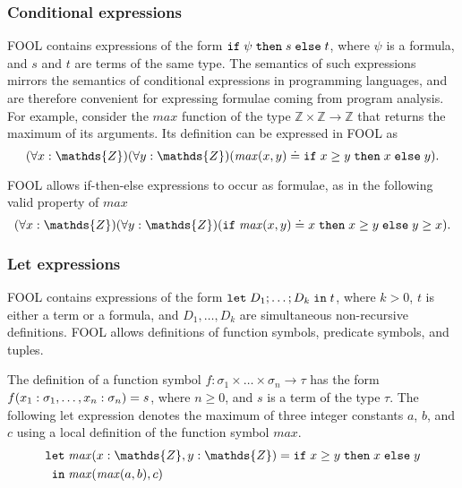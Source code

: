 \documentclass{easychair}
\begin{document}
\subsubsection*{Conditional expressions}
FOOL contains expressions of the form $\mathtt{if}\;{\psi}\;\allowbreak\mathtt{then}\;{s}\;\allowbreak\mathtt{else}\;{t}$, where $\psi$ is a
formula, and $s$ and $t$ are terms of the same type. 
The semantics of such expressions mirrors the semantics of conditional 
expressions in programming languages, and are therefore convenient for 
expressing formulae coming from program analysis. 
For example, consider the $\mathit{max}$ function of the type 
$\mathds{Z}\times\mathds{Z}\to\mathds{Z}$ that returns the maximum of its 
arguments. 
Its definition can be expressed in FOOL as
\begin{equation}\label{eq:ite-t-example}
(\forall x:\mathds{Z})(\forall y:\mathds{Z})
(\mathit{max}(x, y) \eql \ite{x \geq y}{x}{y}).
\end{equation}

FOOL allows if-then-else expressions to occur as formulae, as in the
following valid property of $\mathit{max}$
\begin{equation}\label{eq:ite-f-example}
(\forall x:\mathds{Z})(\forall y:\mathds{Z})
(\ite{\mathit{max}(x, y) \eql x}{x \geq y}{y \geq x}).
\end{equation}

\subsubsection*{Let expressions}
FOOL contains expressions of the form $\mathtt{let}\;{D_1;\ldots;D_k}\;\allowbreak\mathtt{in}\;{t}$, where
$k > 0$, $t$ is either a term or a formula, and $D_1,\ldots,D_k$ are
simultaneous non-recursive definitions. FOOL allows definitions of function
symbols, predicate symbols, and tuples.

The definition of a function symbol 
$f:\sigma_1\times\ldots\times\sigma_n\to\tau$ has the form 
${f(x_1:\sigma_1,\ldots,x_n:\sigma_n)}={s}$, where
$n \geq 0$, and $s$ is a term of the type $\tau$.
The following let expression denotes the maximum of three integer constants
$a$, $b$, and $c$ using a local definition of the function symbol
$\mathit{max}$.
\begin{equation}\label{eq:fool-let-impl}
\begin{aligned}
\mathtt{let}\;&\binding{\mathit{max}(x:\mathds{Z},y:\mathds{Z})}
                       {\ite{x \geq y}{x}{y}}\\
 \mathtt{in}\;&\mathit{max}(\mathit{max}(a,b),c)
\end{aligned}
\end{equation}
\end{document}
